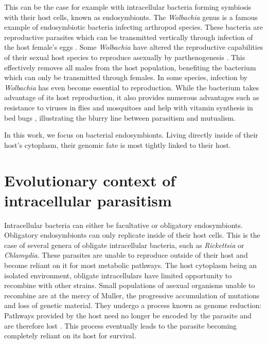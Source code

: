 This can be the case for example with intracellular bacteria forming symbiosis with their host cells, known as endosymbionts. The \textit{Wolbachia} genus is a famous example of endosymbiotic bacteria infecting arthropod species. These bacteria are reproductive parasites which can be transmitted vertically through infection of the host female's eggs \cite{knightMeetHerodBug2001}. Some \textit{Wolbachia} have altered the reproductive capabilities of their sexual host species to reproduce asexually by \Gls{parthenogenesis} \cite{stouthamerMolecularIdentificationMicroorganisms1993}. This effectively removes all males from the host population, benefiting the bacterium which can only be transmitted through females. In some species, infection by \textit{Wolbachia} has even become essential to reproduction. While the bacterium takes advantage of its host reproduction, it also provides numerous advantages such as resistance to viruses in flies and mosquitoes \citep{hedgesWolbachiaVirusProtection2008,teixeiraBacterialSymbiontWolbachia2008} and help with vitamin synthesis in bed bugs \cite{nikohEvolutionaryOriginInsectWolbachia2014}, illustrating the blurry line between parasitism and mutualism.

In this work, we focus on bacterial endosymbionts. Living directly inside of their host's cytoplasm, their genomic fate is most tightly linked to their host.

\section{Evolutionary context of intracellular parasitism}

Intracellular bacteria can either be facultative or obligatory endosymbionts. Obligatory endosymbionts can only replicate inside of their host cells. This is the case of several genera of obligate intracellular bacteria, such as \textit{Rickettsia} or \textit{Chlamydia}. These parasites are unable to reproduce outside of their host and become reliant on it for most metabolic pathways. The host cytoplasm being an isolated environment, obligate intracellulars have limited opportunity to recombine with other strains. Small populations of asexual organisms unable to recombine are at the mercy of \Gls{Muller}, the progressive accumulation of mutations and loss of genetic material. They undergo a process known as genome reduction: Pathways provided by the host need no longer be encoded by the parasite and are therefore lost \cite{mccutcheonExtremeGenomeReduction2012}. This process eventually leads to the parasite becoming completely reliant on its host for survival.


